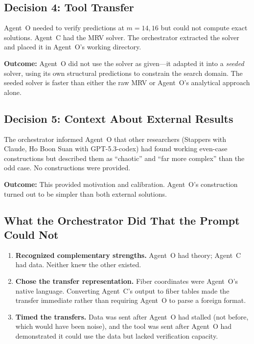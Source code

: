 \documentclass[11pt]{article}
\theoremstyle{definition}
\theoremstyle{remark}
\begin{document}
\subsection{Decision 4: Tool Transfer}

Agent~O needed to verify predictions at $m = 14, 16$ but could not compute exact solutions. Agent~C had the MRV solver. The orchestrator extracted the solver and placed it in Agent~O's working directory.

\textbf{Outcome:} Agent~O did not use the solver as given---it adapted it into a \emph{seeded} solver, using its own structural predictions to constrain the search domain. The seeded solver is faster than either the raw MRV or Agent~O's analytical approach alone.

\subsection{Decision 5: Context About External Results}

The orchestrator informed Agent~O that other researchers (Stappers with Claude, Ho Boon Suan with GPT-5.3-codex) had found working even-case constructions but described them as ``chaotic'' and ``far more complex'' than the odd case. No constructions were provided.

\textbf{Outcome:} This provided motivation and calibration. Agent~O's construction turned out to be simpler than both external solutions.

\subsection{What the Orchestrator Did That the Prompt Could Not}

\begin{enumerate}
    \item \textbf{Recognized complementary strengths.} Agent~O had theory; Agent~C had data. Neither knew the other existed.
    \item \textbf{Chose the transfer representation.} Fiber coordinates were Agent~O's native language. Converting Agent~C's output to fiber tables made the transfer immediate rather than requiring Agent~O to parse a foreign format.
    \item \textbf{Timed the transfers.} Data was sent after Agent~O had stalled (not before, which would have been noise), and the tool was sent after Agent~O had demonstrated it could use the data but lacked verification capacity.
\end{enumerate}
\end{document}
